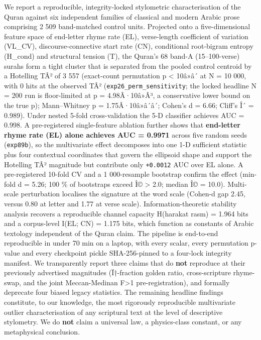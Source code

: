 \documentclass[
]{article}
\begin{document}
We report a reproducible, integrity-locked stylometric characterisation
of the Quran against six independent families of classical and modern
Arabic prose comprising 2 509 band-matched control units. Projected onto
a five-dimensional feature space of end-letter rhyme rate (EL),
verse-length coefficient of variation (VL\_CV), discourse-connective
start rate (CN), conditional root-bigram entropy (H\_cond) and
structural tension (T), the Quran's 68 band-A (15--100-verse) surahs
form a tight cluster that is separated from the pooled control centroid
by a Hotelling TÂ² of 3 557 (exact-count permutation p \textless{}
10â»â´ at N = 10 000, with 0 hits at the observed TÂ²
(\texttt{exp26\_perm\_sensitivity}; the locked headline N = 200 run is
floor-limited at p = 4.98Â·10â»Â³, a conservative lower bound on the
true p); Mann--Whitney p = 1.75Â·10â»â´â´; Cohen's d = 6.66; Cliff's Î´
= 0.989). Under nested 5-fold cross-validation the 5-D classifier
achieves AUC = 0.998. A pre-registered single-feature ablation further
shows that \textbf{end-letter rhyme rate (EL) alone achieves AUC =
0.9971} across five random seeds (\texttt{exp89b}), so the multivariate
effect decomposes into one 1-D sufficient statistic plus four contextual
coordinates that govern the ellipsoid shape and support the Hotelling
TÂ² magnitude but contribute only \texttt{+0.0012} AUC over EL alone. A
pre-registered 10-fold CV and a 1 000-resample bootstrap confirm the
effect (min-fold d = 5.26; 100 \% of bootstraps exceed Î© \textgreater{}
2.0; median Î© = 10.0). Multi-scale perturbation localises the signature
at the word scale (Cohen-d gap 2.45, versus 0.80 at letter and 1.77 at
verse scale). Information-theoretic stability analysis recovers a
reproducible channel capacity H(harakat \textbar{} rasm) = 1.964 bits
and a corpus-level I(EL; CN) = 1.175 bits, which function as constants
of Arabic textology independent of the Quran claim. The pipeline is
end-to-end reproducible in under 70 min on a laptop, with every scalar,
every permutation p-value and every checkpoint pickle SHA-256-pinned to
a four-lock integrity manifest. We transparently report three claims
that do \textbf{not} reproduce at their previously advertised magnitudes
(Ï†-fraction golden ratio, cross-scripture rhyme-swap, and the joint
Meccan-Medinan F\textgreater1 pre-registration), and formally deprecate
four biased legacy statistics. The remaining headline findings
constitute, to our knowledge, the most rigorously reproducible
multivariate outlier characterisation of any scriptural text at the
level of descriptive stylometry. We do \textbf{not} claim a universal
law, a physics-class constant, or any metaphysical conclusion.
\end{document}
